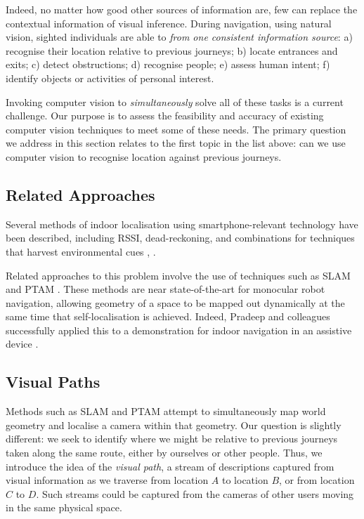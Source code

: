 Indeed, no matter how good other sources of information are, few can replace the contextual information of visual inference.  During navigation, using natural vision, sighted individuals are able to {\em from one consistent information source}: a) recognise their location relative to previous journeys; b) locate entrances and exits; c) detect obstructions; d) recognise people; e) assess human intent;
f) identify objects or activities of personal interest.

Invoking computer vision to {\it simultaneously} solve all of these tasks is a current challenge.  Our purpose is to assess the feasibility and accuracy of existing computer vision techniques to meet some of these needs.  The primary question we address in this section relates to the first topic in the list above: can we use computer vision to recognise location against previous journeys.

\subsection{Related Approaches}
 
 Several methods of indoor localisation using smartphone-relevant technology have been described, including RSSI, dead-reckoning, and combinations for techniques that harvest environmental cues \cite{Wang2012}, \cite{Shen}. 
 
 Related approaches to this problem involve the use of techniques such as SLAM \cite{Durrant-Whyte2006} and PTAM \cite{Klein2009}. These methods are near state-of-the-art for monocular robot navigation, allowing geometry of a space to be mapped out dynamically at the same time that self-localisation is achieved.  Indeed, Pradeep and colleagues successfully applied this to a demonstration for indoor navigation in an assistive device \cite{Pradeep2010}.

\subsection{Visual Paths} 

 Methods such as SLAM and PTAM attempt to simultaneously map world geometry and localise a camera within that geometry.  Our question is slightly different: we seek to identify where we might be relative to previous journeys taken along the same route, either by ourselves or other people.  Thus, we introduce the idea of the {\it visual path}, a stream of descriptions captured from visual information as we traverse from location $A$ to location $B$, or from location $C$ to $D$. Such streams could be captured from the cameras of other users moving in the same physical space.

